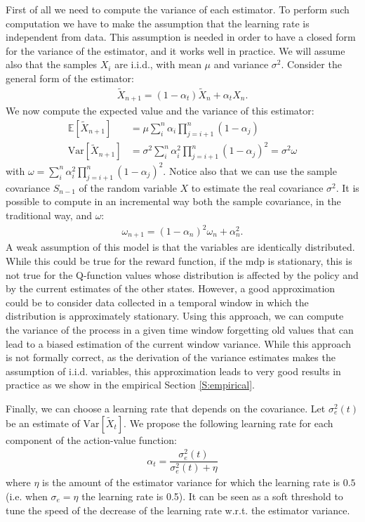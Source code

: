 First of all we need to compute the variance of each estimator. To perform such computation we have to make the assumption that the learning rate is independent from data. This assumption is needed in order to have a closed form for the variance of the estimator, and it works well in practice. We will assume also that the samples $X_i$ are i.i.d., with mean $\mu$ and variance $\sigma^2$. Consider the general form of the estimator:
\begin{align}
 \widetilde{X}_{n+1} = (1-\alpha_t)\widetilde{X}_{n}+\alpha_tX_{n}.
\end{align}
We now compute the expected value and the variance of this estimator:
\begin{align}
 \mathbb{E}\left[\widetilde{X}_{n+1}\right]& = \mu\sum_i^n \alpha_i \prod_{j=i+1}^{n} \left(1-\alpha_j\right)\\
 \mathrm{Var}\left[\widetilde{X}_{n+1}\right]& = \sigma^2\sum_i^n \alpha_i^2 \prod_{j=i+1}^{n} \left(1-\alpha_j\right)^2 = \sigma^2\omega
\end{align}
with $\omega=\sum_i^n \alpha_i^2 \prod_{j=i+1}^{n} \left(1-\alpha_j\right)^2$. Notice also that we can use the sample covariance $S_{n-1}$ of the random variable $X$ to estimate the real covariance $\sigma^2$. It is possible to compute in an incremental way both the sample covariance, in the traditional way, and $\omega$:
\begin{align}
 \omega_{n+1}=(1-\alpha_n)^2\omega_n+\alpha_n^2.
\end{align}
A weak assumption of this model is that the variables are identically distributed. While this could be true for the reward function, if the \gls{mdp} is stationary, this is not true for the Q-function values whose distribution is affected by the policy and by the current estimates of the other states. However, a good approximation could be to consider data collected in a temporal window in which the distribution is approximately stationary. Using this approach, we can compute the variance of the process in a given time window forgetting old values that can lead to a biased estimation of the current window variance. While this approach is not formally correct, as the derivation of the variance estimates makes the assumption of i.i.d. variables, this approximation leads to very good results in practice as we show in the empirical Section \ref{S:empirical}.

Finally, we can choose a learning rate that depends on the covariance. Let $\sigma_e^2(t)$ be an estimate of $\mathrm{Var}\left[\widetilde{X}_{t}\right]$. We propose the following learning rate for each component of the action-value function:
\begin{align}\label{eq:alpha_eq}
 \alpha_t=\dfrac{\sigma_e^2(t)}{\sigma_e^2(t)+\eta}
\end{align}
where $\eta$ is the amount of the estimator variance for which the learning rate is $0.5$ (i.e. when $\sigma_e=\eta$ the learning rate is 0.5). It can be seen as a soft threshold to tune the speed of the decrease of the learning rate w.r.t. the estimator variance.

